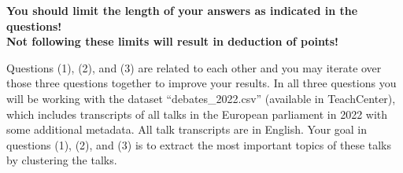 \documentclass[a4paper,10pt]{article}
\begin{document}
{\color{red}	
	\large
	\begin{center}
	\vfill
	\textbf{You should limit the length of your answers as indicated in the questions!\\Not following these limits will result in deduction of points!}
	\end{center}
}

\clearpage

{\color{blue}	
Questions (1), (2), and (3) are related to each other and you may iterate over those three questions together to improve your results. In all three questions you will be working with the dataset ``debates\_2022.csv'' (available in TeachCenter), which includes transcripts of all talks in the European parliament in 2022 with some additional metadata. All talk transcripts are in English. Your goal in questions (1), (2), and (3) is to extract the most important topics of these talks by clustering the talks.\\
}
	
\end{document}
